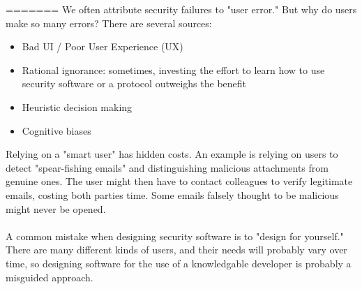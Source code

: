 =======
We often attribute security failures to "user error." But why do users make so many errors? There are several sources:
\begin{itemize}
    \item Bad UI / Poor User Experience (UX)
    \item Rational ignorance: sometimes, investing the effort to learn how to use security software or a protocol outweighs the benefit
    \item Heuristic decision making
    \item Cognitive biases
\end{itemize}

Relying on a "smart user" has hidden costs. An example is relying on users to detect "spear-fishing emails" and distinguishing malicious attachments from genuine ones. The user might then have to contact colleagues to verify legitimate emails, costing both parties time. Some emails falsely thought to be malicious might never be opened. 
\\
\\
A common mistake when designing security software is to "design for yourself." There are many different kinds of users, and their needs will probably vary over time, so designing software for the use of a knowledgable developer is probably a misguided approach. 

